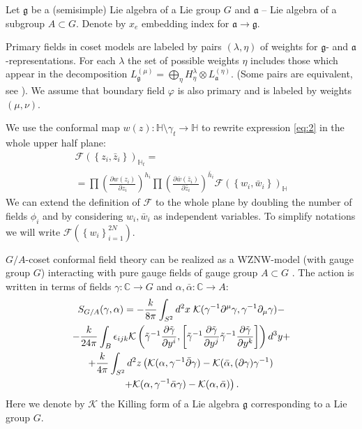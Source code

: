 \documentclass{jetpl}
\newcommand{\gf}{\mathfrak{g}}
\newcommand{\af}{\mathfrak{a}}
\begin{document}
Let $\gf$ be a (semisimple) Lie algebra of a Lie group $G$ and $\af$ -- Lie algebra of a subgroup $A\subset G$. Denote by $x_{e}$ embedding index for $\af\to\gf$. 

Primary fields in coset models are labeled by pairs $(\lambda,\eta)$ of weights for $\gf$- and $\af$-representations. For each $\lambda$ the set of possible weights $\eta$ includes those which appear in the decomposition  $L^{(\mu)}_{\gf}=\bigoplus_{\eta} H^{\lambda}_{\eta}\otimes L^{(\eta)}_{\af}$. (Some pairs are equivalent, see \cite{fuchs1996resolution,schellekens1990field}). We assume that boundary field $\varphi$ is also primary and is labeled by weights $(\mu,\nu)$.

  We use the conformal map  $w(z):\mathbb{H}\setminus\gamma_{t}\to \mathbb{H}$ to rewrite expression \eqref{eq:2} in the whole upper half plane:
\begin{multline}
  \mathcal{F}(\left\{z_{i},\bar z_{i}\right\})_{\mathbb{H}_{t}}=\\
  =\prod \left(\frac{\partial w(z_{i})}{\partial z_{i}}\right)^{h_{i}} 
  \prod \left(\frac{\partial \bar w(\bar z_{i})}{\partial \bar z_{i}}\right)^{\bar h_i}
  \mathcal{F}(\left\{w_{i}, \bar w_{i}\right\})_{\mathbb{H}}
  \label{eq:1}
\end{multline}
We can extend the definition of $\mathcal{F}$ to the whole plane by doubling the number of fields $\phi_{i}$ \cite{cardy2004boundary,cardy1984conformal} and by considering $w_{i},\bar w_{i}$ as independent variables. To simplify notations we will write $\mathcal{F}(\left\{w_{i}\right\}_{i=1}^{2N})$.


$G/A$-coset conformal field theory can be realized as a WZNW-model (with gauge group $G$) interacting with pure gauge fields of gauge group $A\subset G$ \cite{gawdzki1988g,figueroa89equivalence}. The action is written in terms of fields $\gamma:\mathbb{C}\to G$ and $\alpha,\bar\alpha:\mathbb{C}\to A$:
\begin{multline}
  \label{eq:24}
      S_{G/A}(\gamma, \alpha)=-\frac{k}{8\pi}\int_{S^2} d^2x\; {\cal K} (\gamma^{-1}\partial^{\mu}\gamma,\gamma^{-1}\partial_{\mu}\gamma)-\\
 - \frac{k }{24\pi} \int_{B}\epsilon_{ijk} {\cal K}\left(
    \tilde \gamma^{-1}\frac{\partial \tilde \gamma}{\partial y^i},
      \left[\tilde \gamma^{-1}\frac{\partial \tilde \gamma}{\partial y^j}
      \tilde \gamma^{-1}\frac{\partial \tilde \gamma}{\partial y^k}\right]\right) d^3y+\\
+
      \frac{k}{4\pi}\int_{S^2} d^{2}z \left(\mathcal{K}(\alpha, \gamma^{-1}\bar \partial \gamma)-\mathcal{K}(\bar \alpha, (\partial \gamma ) \gamma^{-1})\right.\\
      \left.+\mathcal{K}(\alpha,\gamma^{-1}\bar \alpha \gamma)-\mathcal{K}(\alpha,\bar \alpha)\right).
\end{multline}
Here we denote by $\mathcal{K}$ the Killing form of a Lie algebra $\gf$ corresponding to a Lie group $G$.
\end{document}

